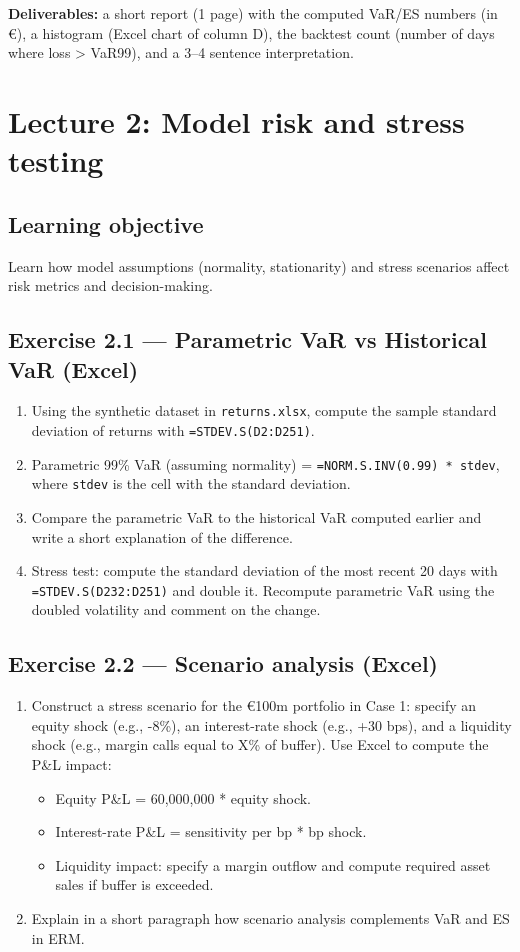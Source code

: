 \documentclass[11pt]{article}
\begin{document}
\textbf{Deliverables:} a short report (1 page) with the computed VaR/ES numbers (in \euro), a histogram (Excel chart of column D), the backtest count (number of days where loss > VaR99), and a 3–4 sentence interpretation.

\newpage
\section{Lecture 2: Model risk and stress testing}
\subsection*{Learning objective}
Learn how model assumptions (normality, stationarity) and stress scenarios affect risk metrics and decision-making.

\subsection*{Exercise 2.1 --- Parametric VaR vs Historical VaR (Excel)}
\begin{enumerate}
  \item Using the synthetic dataset in \texttt{returns.xlsx}, compute the sample standard deviation of returns with \texttt{=STDEV.S(D2:D251)}.
  \item Parametric 99\% VaR (assuming normality) = \texttt{=NORM.S.INV(0.99) * stdev}, where \texttt{stdev} is the cell with the standard deviation.
  \item Compare the parametric VaR to the historical VaR computed earlier and write a short explanation of the difference.
  \item Stress test: compute the standard deviation of the most recent 20 days with \texttt{=STDEV.S(D232:D251)} and double it. Recompute parametric VaR using the doubled volatility and comment on the change.
\end{enumerate}

\subsection*{Exercise 2.2 --- Scenario analysis (Excel)}
\begin{enumerate}
  \item Construct a stress scenario for the €100m portfolio in Case 1: specify an equity shock (e.g., -8\%), an interest-rate shock (e.g., +30 bps), and a liquidity shock (e.g., margin calls equal to X\% of buffer). Use Excel to compute the P\&L impact:
    \begin{itemize}
      \item Equity P\&L = 60,000,000 * equity shock.
      \item Interest-rate P\&L = sensitivity per bp * bp shock.
      \item Liquidity impact: specify a margin outflow and compute required asset sales if buffer is exceeded.
    \end{itemize}
  \item Explain in a short paragraph how scenario analysis complements VaR and ES in ERM.
\end{enumerate}
\end{document}
